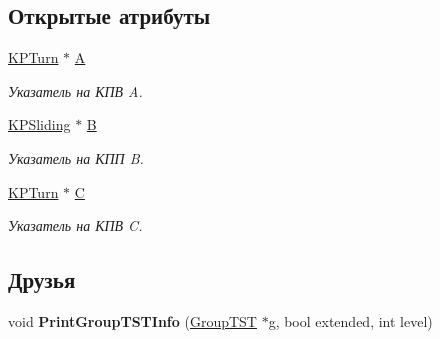 \subsection*{Открытые атрибуты}
\begin{DoxyCompactItemize}
\item 
\hypertarget{class_group_t_s_t_a3b1a4a4ae099d37c7ba4a3de9469c01c}{
\hyperlink{class_k_p_turn}{KPTurn} $\ast$ \hyperlink{class_group_t_s_t_a3b1a4a4ae099d37c7ba4a3de9469c01c}{A}}
\label{class_group_t_s_t_a3b1a4a4ae099d37c7ba4a3de9469c01c}

\begin{DoxyCompactList}\small\item\em Указатель на КПВ A. \item\end{DoxyCompactList}\item 
\hypertarget{class_group_t_s_t_ab16d5dc81c78e61d07281c9d6dcc6fd5}{
\hyperlink{class_k_p_sliding}{KPSliding} $\ast$ \hyperlink{class_group_t_s_t_ab16d5dc81c78e61d07281c9d6dcc6fd5}{B}}
\label{class_group_t_s_t_ab16d5dc81c78e61d07281c9d6dcc6fd5}

\begin{DoxyCompactList}\small\item\em Указатель на КПП B. \item\end{DoxyCompactList}\item 
\hypertarget{class_group_t_s_t_a795d4681f15bb10346a491c1b4ac10da}{
\hyperlink{class_k_p_turn}{KPTurn} $\ast$ \hyperlink{class_group_t_s_t_a795d4681f15bb10346a491c1b4ac10da}{C}}
\label{class_group_t_s_t_a795d4681f15bb10346a491c1b4ac10da}

\begin{DoxyCompactList}\small\item\em Указатель на КПВ C. \item\end{DoxyCompactList}\end{DoxyCompactItemize}
\subsection*{Друзья}
\begin{DoxyCompactItemize}
\item 
\hypertarget{class_group_t_s_t_aaae0f290cbddd597fc97a6c3f5b1feb4}{
void {\bfseries PrintGroupTSTInfo} (\hyperlink{class_group_t_s_t}{GroupTST} $\ast$g, bool extended, int level)}
\label{class_group_t_s_t_aaae0f290cbddd597fc97a6c3f5b1feb4}

\end{DoxyCompactItemize}


